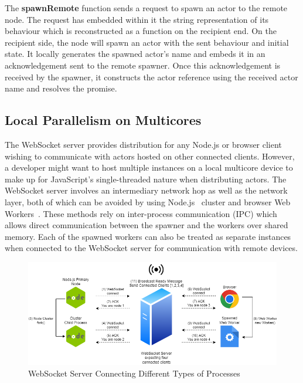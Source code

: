 \documentclass[oneside]{um-fict}
\begin{document}
The \textbf{spawnRemote} function sends a request to spawn an actor to the remote node. The request has embedded within it the string representation of its behaviour which is reconstructed as a function on the recipient end. On the recipient side, the node will spawn an actor with the sent behaviour and initial state. It locally generates the spawned actor's name and embeds it in an acknowledgement sent to the remote spawner. Once this acknowledgement is received by the spawner, it constructs the actor reference using the received actor name and resolves the promise.
\subsection{Local Parallelism on Multicores}
The WebSocket server provides distribution for any Node.js or browser client wishing to communicate with actors hosted on other connected clients. However, a developer might want to host multiple instances on a local multicore device to make up for JavaScript's single-threaded nature when distributing actors. The WebSocket server involves an intermediary network hop as well as the network layer, both of which can be avoided by using Node.js~\cite{nodejs} cluster and browser Web Workers~\cite{webworkers}. These methods rely on inter-process communication (IPC) which allows direct communication between the spawner and the workers over shared memory. Each of the spawned workers can also be treated as separate instances when connected to the WebSocket server for communication with remote devices.

\begin{figure}[H]
    \begin{centering}
        \includegraphics[width=\textwidth]{resources/websocketconnectioncomplex.png}
        \caption{WebSocket Server Connecting Different Types of Processes}\label{fig:websocketconnectioncomplex}
    \end{centering}
\end{figure}
\end{document}
